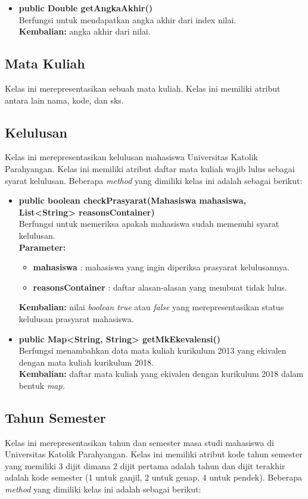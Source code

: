 \begin{itemize}
	\item \textbf{public Double getAngkaAkhir()} \\
		Berfungsi untuk mendapatkan angka akhir dari index nilai. \\
		\textbf{Kembalian:} angka akhir dari nilai.	
\end{itemize}

\subsection{Mata Kuliah}
Kelas ini merepresentasikan sebuah mata kuliah. Kelas ini memiliki atribut antara lain nama, kode, dan sks.

\subsection{Kelulusan}
Kelas ini merepresentasikan kelulusan mahasiswa Universitas Katolik Parahyangan. Kelas ini memiliki atribut daftar mata kuliah wajib lulus sebagai syarat kelulusan. Beberapa \textit{method} yang dimiliki kelas ini adalah sebagai berikut:

\begin{itemize}
	\item \textbf{public boolean checkPrasyarat(Mahasiswa mahasiswa, List<String> reasonsContainer)} \\
		Berfungsi untuk memeriksa apakah mahasiswa sudah memenuhi syarat kelulusan. \\
		\textbf{Parameter:} 
		\begin{itemize}
			\item \textbf{mahasiswa} : mahasiswa yang ingin diperiksa prasyarat kelulusannya.
			\item \textbf{reasonsContainer} : daftar alasan-alasan yang membuat tidak lulus.
		\end{itemize}
		\textbf{Kembalian:} nilai \textit{boolean true} atau \textit{false} yang merepresentasikan status kelulusan prasyarat mahasiswa.	
	\item \textbf{public Map<String, String> getMkEkevalensi()}\\
	    Berfungsi menambahkan data mata kuliah kurikulum 2013 yang ekivalen dengan mata kuliah kurikulum 2018. \\
	    \textbf{Kembalian:} daftar mata kuliah yang ekivalen dengan kurikulum 2018 dalam bentuk \textit{map.}
\end{itemize}

\subsection{Tahun Semester}
Kelas ini merepresentasikan tahun dan semester masa studi mahasiswa di Universitas Katolik Parahyangan. Kelas ini memiliki atribut kode tahun semester yang memiliki 3 dijit dimana 2 dijit pertama adalah tahun dan dijit terakhir adalah kode semester (1 untuk ganjil, 2 untuk genap, 4 untuk pendek). Beberapa \textit{method} yang dimiliki kelas ini adalah sebagai berikut:

